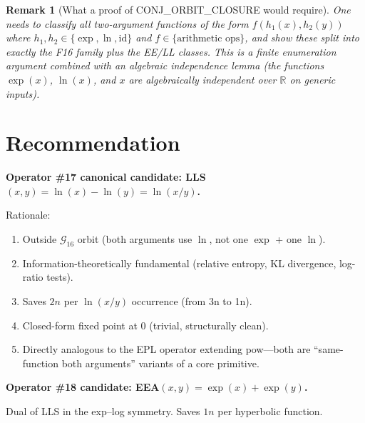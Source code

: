 \documentclass[11pt]{article}
\newtheorem{remark}[theorem]{Remark}
\begin{document}
\begin{remark}[What a proof of CONJ\_ORBIT\_CLOSURE would require]
One needs to classify all two-argument functions of the form
$f(h_1(x), h_2(y))$ where $h_1, h_2 \in \{\exp, \ln, \mathrm{id}\}$ and
$f \in \{\text{arithmetic ops}\}$, and show these split into exactly the
F16 family plus the EE/LL classes. This is a finite enumeration argument
combined with an algebraic independence lemma (the functions $\exp(x)$,
$\ln(x)$, and $x$ are algebraically independent over $\mathbb{R}$ on generic inputs).
\end{remark}

\section{Recommendation}
\label{sec:recommendation}

\textbf{Operator \#17 canonical candidate: LLS$(x,y) = \ln(x) - \ln(y) = \ln(x/y)$.}

Rationale:
\begin{enumerate}
  \item Outside $\mathcal{G}_{16}$ orbit (both arguments use $\ln$, not one $\exp$ + one $\ln$).
  \item Information-theoretically fundamental (relative entropy, KL divergence, log-ratio tests).
  \item Saves $2n$ per $\ln(x/y)$ occurrence (from 3n to 1n).
  \item Closed-form fixed point at 0 (trivial, structurally clean).
  \item Directly analogous to the EPL operator extending pow---both are
        ``same-function both arguments'' variants of a core primitive.
\end{enumerate}

\textbf{Operator \#18 candidate: EEA$(x,y) = \exp(x) + \exp(y)$.}

Dual of LLS in the exp--log symmetry. Saves $1n$ per hyperbolic function.
\end{document}
